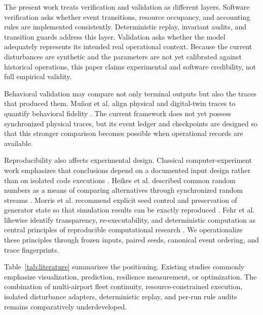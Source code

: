 \documentclass[runningheads]{llncs}
\begin{document}
The present work treats verification and validation as different layers. Software verification asks whether event transitions, resource occupancy, and accounting rules are implemented consistently. Deterministic replay, invariant audits, and transition guards address this layer. Validation asks whether the model adequately represents its intended real operational context. Because the current disturbances are synthetic and the parameters are not yet calibrated against historical operations, this paper claims experimental and software credibility, not full empirical validity.

Behavioral validation may compare not only terminal outputs but also the traces that produced them. Mu\~noz et al. align physical and digital-twin traces to quantify behavioral fidelity \cite{munoz2024}. The current framework does not yet possess synchronized physical traces, but its event ledger and checkpoints are designed so that this stronger comparison becomes possible when operational records are available.

Reproducibility also affects experimental design. Classical computer-experiment work emphasizes that conclusions depend on a documented input design rather than on isolated code executions \cite{sacks1989}. Heikes et al. described common random numbers as a means of comparing alternatives through synchronized random streams \cite{heikes1976}. Morris et al. recommend explicit seed control and preservation of generator state so that simulation results can be exactly reproduced \cite{morris2019}. Fehr et al. likewise identify transparency, re-executability, and deterministic computation as central principles of reproducible computational research \cite{fehr2021}. We operationalize these principles through frozen inputs, paired seeds, canonical event ordering, and trace fingerprints.

Table~\ref{tab:literature} summarizes the positioning. Existing studies commonly emphasize visualization, prediction, resilience measurement, or optimization. The combination of multi-airport fleet continuity, resource-constrained execution, isolated disturbance adapters, deterministic replay, and per-run rule audits remains comparatively underdeveloped.
\end{document}
